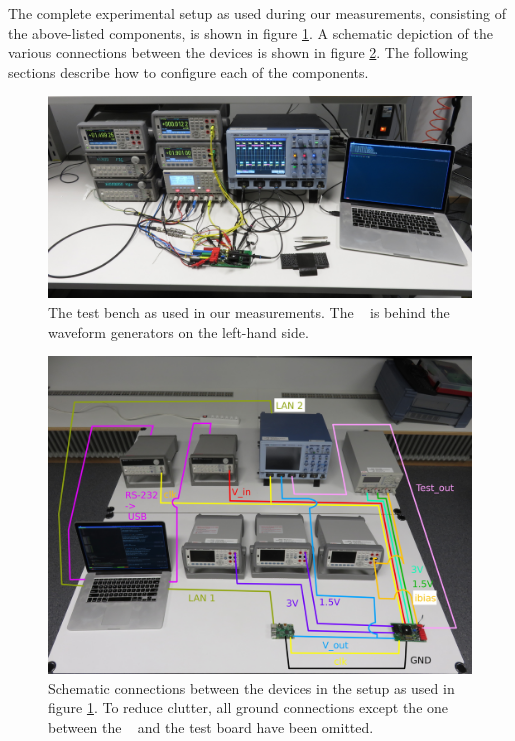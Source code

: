 The complete experimental setup as used during our measurements, consisting of
the above-listed components, is shown in figure \ref{fig:testBenchComplete}. A
schematic depiction of the various connections between the devices is shown in
figure \ref{fig:testBenchConnections}. The following  sections describe how to
configure each of the components.

\begin{figure}
    \includegraphics[width=\textwidth]{images/expSetup/testBenchComplete.jpeg}
    \caption{
        The test bench as used in  our measurements. The \raspi~ is behind the
        waveform generators on the left-hand side.%
    }
    \label{fig:testBenchComplete}
\end{figure}

\begin{figure}
    \includegraphics[width=\textwidth]{images/expSetup/testBenchConnections.jpeg}
    \caption{%
        Schematic  connections between  the devices  in the  setup as  used in
        figure  \ref{fig:testBenchComplete}. To  reduce  clutter,  all  ground
        connections except the one between the \raspi~ and the test board have
        been omitted.%
    }
    \label{fig:testBenchConnections}
\end{figure}

